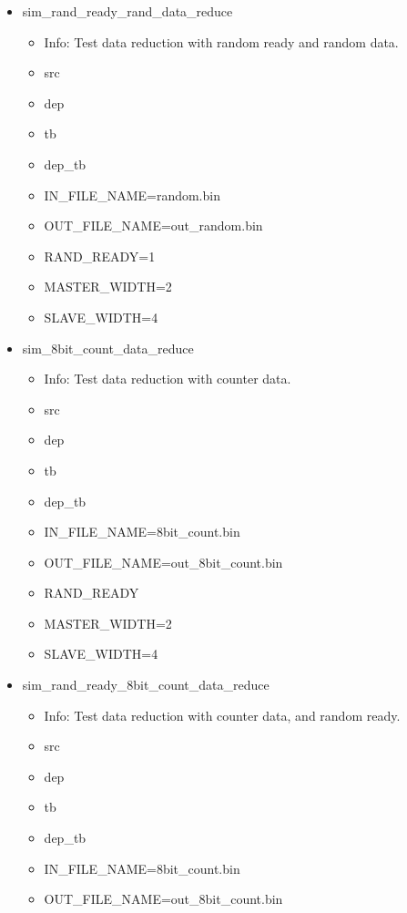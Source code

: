 \begin{itemize}
\begin{itemize}
	\item OUT\_FILE\_NAME=out\_random.bin
	\item RAND\_READY
	\item MASTER\_WIDTH=2
	\item SLAVE\_WIDTH=4
	\end{itemize}
\item sim\_rand\_ready\_rand\_data\_reduce
	\begin{itemize}
	\item[$\space$] Info: Test data reduction with random ready and random data.
	\item src
	\item dep
	\item tb
	\item dep\_tb
	\item IN\_FILE\_NAME=random.bin
	\item OUT\_FILE\_NAME=out\_random.bin
	\item RAND\_READY=1
	\item MASTER\_WIDTH=2
	\item SLAVE\_WIDTH=4
	\end{itemize}
\item sim\_8bit\_count\_data\_reduce
	\begin{itemize}
	\item[$\space$] Info: Test data reduction with counter data.
	\item src
	\item dep
	\item tb
	\item dep\_tb
	\item IN\_FILE\_NAME=8bit\_count.bin
	\item OUT\_FILE\_NAME=out\_8bit\_count.bin
	\item RAND\_READY
	\item MASTER\_WIDTH=2
	\item SLAVE\_WIDTH=4
	\end{itemize}
\item sim\_rand\_ready\_8bit\_count\_data\_reduce
	\begin{itemize}
	\item[$\space$] Info: Test data reduction with counter data, and random ready.
	\item src
	\item dep
	\item tb
	\item dep\_tb
	\item IN\_FILE\_NAME=8bit\_count.bin
	\item OUT\_FILE\_NAME=out\_8bit\_count.bin

\end{itemize}
\end{itemize}
